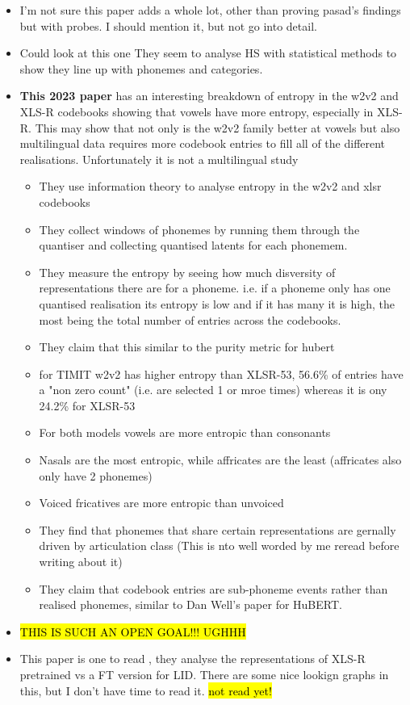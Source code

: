 \begin{itemize}
    \item I'm not sure this paper adds a whole lot, other than proving pasad's findings but with probes. I should mention it, but not go into detail.
\fi
    \item Could look at this one \cite{sicherman2023analysingdiscrete} They seem to analyse HS with statistical methods to show they line up with phonemes and categories.
    \item \textbf{This 2023 paper} has an interesting breakdown of entropy in the w2v2 and XLS-R codebooks showing that vowels have more entropy, especially in XLS-R. This may show that not only is the w2v2 family better at vowels but also multilingual data requires more codebook entries to fill all of the different realisations. Unfortunately it is not a multilingual study \cite{abdullah2023information}
    \begin{itemize}
        \item They use information theory to analyse entropy in the w2v2 and xlsr codebooks
        \item They collect windows of phonemes by running them through the quantiser and collecting quantised latents for each phonemem.
        \item They measure the entropy by seeing how much disversity of representations there are for a phoneme. i.e. if a phoneme only has one quantised realisation its entropy is low and if it has many it is high, the most being the total number of entries across the codebooks.
        \item They claim that this similar to the purity metric for hubert
        \item for TIMIT w2v2 has higher entropy than XLSR-53, 56.6\% of entries have a "non zero count" (i.e. are selected 1 or mroe times) whereas it is ony 24.2\% for XLSR-53
        \item For both models vowels are more entropic than consonants
        \item Nasals are the most entropic, while affricates are the least (affricates also only have 2 phonemes)
        \item Voiced fricatives are more entropic than unvoiced
        \item They find that phonemes that share certain representations are gernally driven by articulation class (This is nto well worded by me reread before writing about it)
        \item They claim that codebook entries are sub-phoneme events rather than realised phonemes, similar to Dan Well's paper for HuBERT.
    \end{itemize}
    \item \hl{THIS IS SUCH AN OPEN GOAL!!! UGHHH}
    \item This paper is one to read \cite{nocitation}, they analyse the representations of XLS-R pretrained vs a FT version for LID. There are some nice lookign graphs in this, but I don't have time to read it. \hl{not read yet!}
\end{itemize}

